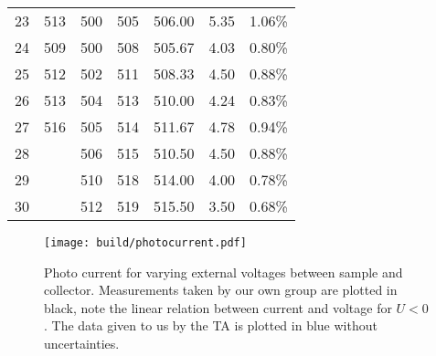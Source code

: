 \begin{table*}
\begin{tabular}{c c c c c c c}
    23&513   &500&505&506.00&5.35&1.06\% \\
    24&509   &500&508&505.67&4.03&0.80\% \\
    25&512   &502&511&508.33&4.50&0.88\% \\
    26&513   &504&513&510.00&4.24&0.83\% \\
    27&516   &505&514&511.67&4.78&0.94\% \\
    28&&506&515&510.50&4.50&0.88\% \\
    29&&510&518&514.00&4.00&0.78\% \\
    30&&512&519&515.50&3.50&0.68\% \\
  \end{tabular}
\end{table*}


\begin{figure*}
  \centering
  \texttt{[image: build/photocurrent.pdf]}
  \caption{Photo current for varying external voltages between sample and collector. Measurements taken by 
  our own group are plotted in black, note the linear relation between current and voltage for
  $U<0$. The data given to us by the TA is plotted in blue without uncertainties.}
  \label{fig:photocurrent}
\end{figure*}
